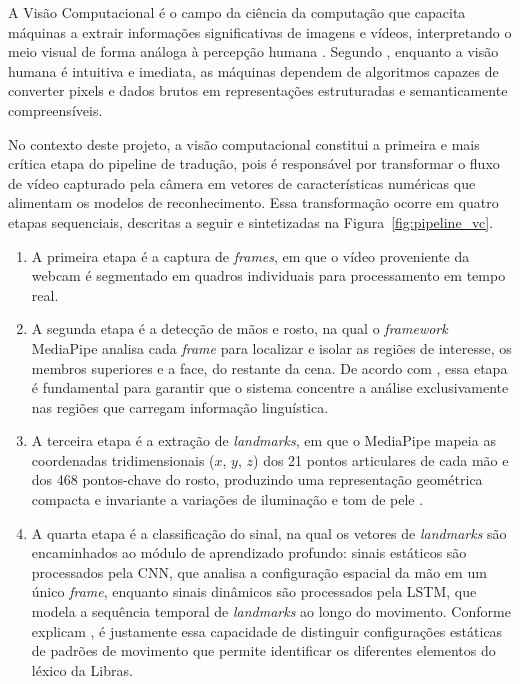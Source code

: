 \documentclass[
    12pt,                %
    openright,           %
    oneside,             %
    a4paper,             %
    english,             %
    brazil               %
]{abntex2}
\begin{document}
A Visão Computacional é o campo da ciência da computação que capacita máquinas a extrair informações significativas de imagens e vídeos, interpretando o meio visual de forma análoga à percepção humana \cite{Milano2014}. Segundo , enquanto a visão humana é intuitiva e imediata, as máquinas dependem de algoritmos capazes de converter pixels e dados brutos em representações estruturadas e semanticamente compreensíveis.
 
No contexto deste projeto, a visão computacional constitui a primeira e mais crítica etapa do pipeline de tradução, pois é responsável por transformar o fluxo de vídeo capturado pela câmera em vetores de características numéricas que alimentam os modelos de reconhecimento. Essa transformação ocorre em quatro etapas sequenciais, descritas a seguir e sintetizadas na Figura~\ref{fig:pipeline_vc}.
 
\begin{enumerate}
    \item A primeira etapa é a captura de \textit{frames}, em que o vídeo proveniente da webcam é segmentado em quadros individuais para processamento em tempo real. 
    \item A segunda etapa é a detecção de mãos e rosto, na qual o \textit{framework} MediaPipe analisa cada \textit{frame} para localizar e isolar as regiões de interesse, os membros superiores e a face, do restante da cena. De acordo com , essa etapa é fundamental para garantir que o sistema concentre a análise exclusivamente nas regiões que carregam informação linguística. 
    \item A terceira etapa é a extração de \textit{landmarks}, em que o MediaPipe mapeia as coordenadas tridimensionais ($x$, $y$, $z$) dos 21 pontos articulares de cada mão e dos 468 pontos-chave do rosto, produzindo uma representação geométrica compacta e invariante a variações de iluminação e tom de pele \cite{Zhang2020}. 
    \item A quarta etapa é a classificação do sinal, na qual os vetores de \textit{landmarks} são encaminhados ao módulo de aprendizado profundo: sinais estáticos são processados pela CNN, que analisa a configuração espacial da mão em um único \textit{frame}, enquanto sinais dinâmicos são processados pela LSTM, que modela a sequência temporal de \textit{landmarks} ao longo do movimento. Conforme explicam , é justamente essa capacidade de distinguir configurações estáticas de padrões de movimento que permite identificar os diferentes elementos do léxico da Libras.
\end{enumerate}
\end{document}
